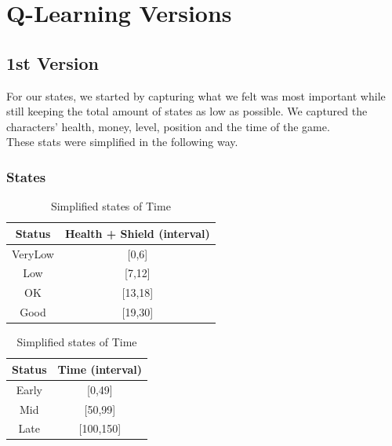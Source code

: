 \documentclass{article}
\begin{document}
  \section{Q-Learning Versions}
  \subsection{1st Version}
  For our states, we started by capturing what we felt was most important while still keeping the total amount of states as low as possible.
  We captured the characters' health, money, level, position and the time of the game.\\
  These stats were simplified in the following way.\\

  \subsubsection{States}
  \begin{table}[h!]
      \parbox{.45\linewidth}{
        \centering
        \caption{Simplified states of Health}
        \label{tab:healthStates}
        \begin{tabular}{c|c}
          \textbf{Status} & \textbf{Health + Shield (interval)}\\
          \hline
          VeryLow & [0,6]\\
          Low & [7,12]\\
          OK & [13,18]\\
          Good & [19,30]\\
        \end{tabular}
      }
      \hfil
      \parbox{.45\linewidth}{
        \centering
        \caption{Simplified states of Time}
        \label{tab:timeStates}
        \begin{tabular}{c|c}
          \textbf{Status} & \textbf{Time (interval)}\\
          \hline
          Early  & [0,49]\\
          Mid & [50,99]\\
          Late & [100,150]\\
        \end{tabular}
      }
  \end{table}
\end{document}
